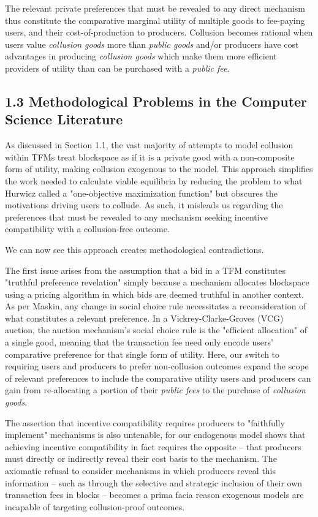 \documentclass[oneside]{article}   	%
\begin{document}
The relevant private preferences that must be revealed to any direct mechanism thus constitute the comparative marginal utility of multiple goods to fee-paying users, and their cost-of-production to producers. Collusion becomes rational when users value \textit{collusion goods} more than \textit{public goods} and/or producers have cost advantages in producing \textit{collusion goods} which make them more efficient providers of utility than can be purchased with a \textit{public fee}.

\subsection*{1.3 Methodological Problems in the Computer Science Literature}

As discussed in Section 1.1, the vast majority of attempts to model collusion within TFMs treat blockspace as if it is a private good with a non-composite form of utility, making collusion exogenous to the model. This approach simplifies the work needed to calculate viable equilibria by reducing the problem to what Hurwicz called a "one-objective maximization function" but obscures the motivations driving users to collude. As such, it misleads us regarding the preferences that must be revealed to any mechanism seeking incentive compatibility with a collusion-free outcome. 

We can now see this approach creates methodological contradictions.

The first issue arises from the assumption that a bid in a TFM constitutes "truthful preference revelation" simply because a mechanism allocates blockspace using a pricing algorithm in which bids are deemed truthful in another context. As per Maskin, any change in social choice rule necessitates a reconsideration of what constitutes a relevant preference. In a Vickrey-Clarke-Groves (VCG) auction, the auction mechanism's social choice rule is the "efficient allocation" of a single good, meaning that the transaction fee need only encode users' comparative preference for that single form of utility. Here, our switch to requiring users and producers to prefer non-collusion outcomes expand the scope of relevant preferences to include the comparative utility users and producers can gain from re-allocating a portion of their \textit{public fees} to the purchase of \textit{collusion goods}.

The assertion that incentive compatibility requires producers to "faithfully implement" mechanisms is also untenable, for our endogenous model shows that achieving incentive compatibility in fact requires the opposite -- that producers must directly or indirectly reveal their cost basis to the mechanism. The axiomatic refusal to consider mechanisms in which producers reveal this information -- such as through the selective and strategic inclusion of their own transaction fees in blocks -- becomes a prima facia reason exogenous models are incapable of targeting collusion-proof outcomes.
\end{document}
